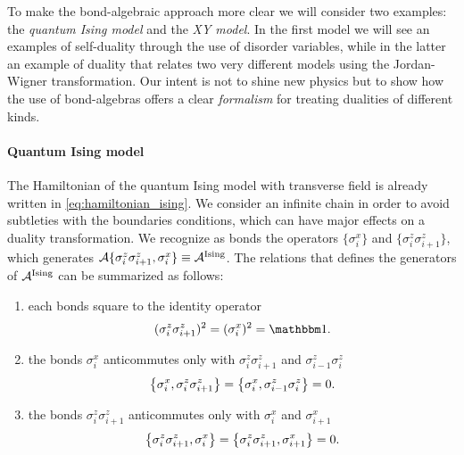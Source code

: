 To make the bond-algebraic approach more clear we will consider two examples:
the \emph{quantum Ising model} and the \emph{XY model}.
In the first model we will see an examples of self-duality through the use of disorder variables, while in the latter an example of duality that relates two very different models using the Jordan-Wigner transformation.
Our intent is not to shine new physics but to show how the use of bond-algebras offers a clear \emph{formalism} for treating dualities of different kinds.


\paragraph{Quantum Ising model}
The Hamiltonian of the quantum Ising model with transverse field is already written in \eqref{eq:hamiltonian_ising}.
We consider an infinite chain in order to avoid subtleties with the boundaries conditions, which can have major effects on a duality transformation.
We recognize as bonds the operators $\{\sigma^x_i\}$ and $\{\sigma^z_i \sigma^z_{i+1}\}$, which generates $\mathcal{A} \{\sigma^z_i \sigma^z_{i+1}, \sigma^x_i\} \equiv \mathcal{A}^{\text{Ising}}$.
The relations that defines the generators of $\mathcal{A}^{\text{Ising}}$ can be summarized as follows:
\begin{enumerate}
    \item each bonds square to the identity operator
        \begin{equation*}
            (\sigma^z_i \sigma^z_{i+1})^2 = (\sigma^x_i)^2 = \identity.
        \end{equation*}

    \item the bonds $\sigma_i^x$ anticommutes only with $\sigma^z_i \sigma^z_{i+1}$ and $\sigma^z_{i-1} \sigma^z_i$
        \begin{equation*}
            \acomm{\sigma_i^x}{\sigma^z_i \sigma^z_{i+1}} =
            \acomm{\sigma_i^x}{\sigma^z_{i-1} \sigma^z_i} = 0.
        \end{equation*}

    \item the bonds $\sigma^z_i \sigma^z_{i+1}$ anticommutes only with $\sigma^x_i$ and $\sigma^x_{i+1}$
        \begin{equation*}
            \acomm{\sigma^z_i \sigma^z_{i+1}}{\sigma^x_i} =
            \acomm{\sigma^z_i \sigma^z_{i+1}}{\sigma^x_{i+1}} = 0.
        \end{equation*}
\end{enumerate}

